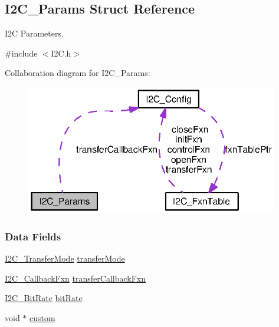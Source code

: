 \subsection{I2\-C\-\_\-\-Params Struct Reference}
\label{struct_i2_c___params}


I2\-C Parameters.  




{\ttfamily \#include $<$I2\-C.\-h$>$}



Collaboration diagram for I2\-C\-\_\-\-Params\-:
\nopagebreak
\begin{figure}[H]
\begin{center}
\leavevmode
\includegraphics[width=313pt]{struct_i2_c___params__coll__graph}
\end{center}
\end{figure}
\subsubsection*{Data Fields}
\begin{DoxyCompactItemize}
\item 
\hyperlink{_i2_c_8h_a39f3b9340fc4ee241b0d2da9b2841c26}{I2\-C\-\_\-\-Transfer\-Mode} \hyperlink{struct_i2_c___params_a79c5c51380ffbdb21df1dff6cb57de0e}{transfer\-Mode}
\item 
\hyperlink{_i2_c_8h_a5ece918abf136397f682df3924441634}{I2\-C\-\_\-\-Callback\-Fxn} \hyperlink{struct_i2_c___params_a57edf1b900368904779d0c57a73cf047}{transfer\-Callback\-Fxn}
\item 
\hyperlink{_i2_c_8h_ac954e3197f04c50293db466c4abb6fbe}{I2\-C\-\_\-\-Bit\-Rate} \hyperlink{struct_i2_c___params_ad31857f6dbedb77c60c92cc8cd8cde0c}{bit\-Rate}
\item 
void $\ast$ \hyperlink{struct_i2_c___params_a2416cc06d853e6cc24e1f294dfebb194}{custom}
\end{DoxyCompactItemize}



